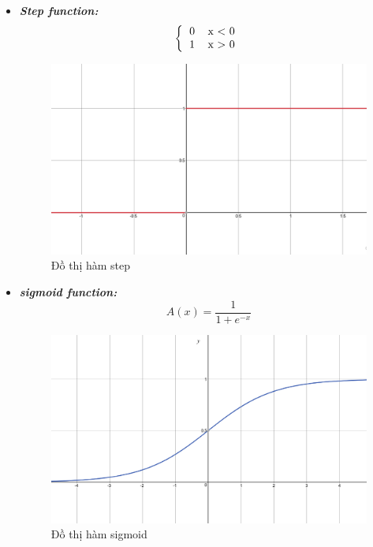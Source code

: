 \begin{itemize}
		\begin{itemize}
			\item \textbf{\textit{Step function: }} 
			\[ 
			\left \{
  			\begin{tabular}{cc}
  				0 & x < 0\\
  				1 &  x > 0 
  			\end{tabular}
		\right.
		\]
		\begin{figure}[h!]
			\centering
			\includegraphics[scale=0.2]{charts/step_fun.png}
			\caption{Đồ thị hàm step}
			\label{fig:plot_step}
		\end{figure}
		
			\item \textbf{\textit{sigmoid function: }}
			\[A(x) =  \frac{1}{1 + e^{-x}}	\]
			\begin{figure}[h!]
				\centering
				\includegraphics[scale=0.2]{charts/sigmoid_fun.png}
				\caption{Đồ thị hàm sigmoid}
				\label{fig:plot_sigmoid}
			\end{figure}
			\pagebreak
			

\end{itemize}
\end{itemize}

